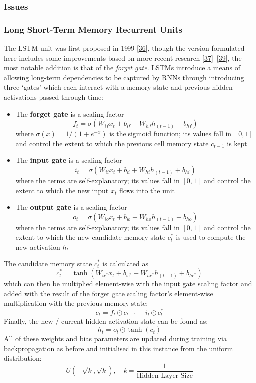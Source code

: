 \documentclass[12pt,]{article}
\providecommand{\tightlist}{%
  \setlength{\itemsep}{0pt}\setlength{\parskip}{0pt}}
\begin{document}
\hypertarget{issues}{%
\subsubsection{Issues}\label{issues}}

\hypertarget{long-short-term-memory-recurrent-units}{%
\subsubsection{Long Short-Term Memory Recurrent
Units}\label{long-short-term-memory-recurrent-units}}

The LSTM unit was first proposed in 1999
{[}\protect\hyperlink{ref-gers1999learning}{36}{]}, though the version
formulated here includes some improvements based on more recent research
{[}\protect\hyperlink{ref-sak2014long}{37}{]}--{[}\protect\hyperlink{ref-zebin2018human}{39}{]},
the most notable addition is that of the \emph{forget gate}. LSTMs
introduce a means of allowing long-term dependencies to be captured by
RNNs through introducing three `gates' which each interact with a memory
state and previous hidden activations passed through time:

\begin{itemize}
\tightlist
\item
  The \textbf{forget gate} is a scaling factor
  \[f_t = \sigma(W_{if} x_t + b_{if} + W_{hf} h_{(t-1)} + b_{hf})\]
  where \(\sigma(x) = 1 / (1 + e^{-x})\) is the sigmoid function; its
  values fall in \([0,1]\) and control the extent to which the previous
  cell memory state \(c_{t-1}\) is kept
\item
  The \textbf{input gate} is a scaling factor
  \[i_t = \sigma(W_{ii} x_t + b_{ii} + W_{hi} h_{(t-1)} + b_{hi})\]
  where the terms are self-explanatory; its values fall in \([0,1]\) and
  control the extent to which the new input \(x_t\) flows into the unit
\item
  The \textbf{output gate} is a scaling factor
  \[o_t = \sigma(W_{io} x_t + b_{io} + W_{ho} h_{(t-1)} + b_{ho})\]
  where the terms are self-explanatory; its values fall in \([0,1]\) and
  control the extent to which the new candidate memory state \(c^*_t\)
  is used to compute the new activation \(h_t\)
\end{itemize}

The candidate memory state \(c^*_t\) is calculated as
\[c^*_t = \tanh(W_{ic^*} x_t + b_{ic^*} + W_{hc^*} h_{(t-1)} + b_{hc^*})\]
which can then be multiplied element-wise with the input gate scaling
factor and added with the result of the forget gate scaling factor's
element-wise multiplication with the previous memory state:
\[c_t = f_t \odot c_{t-1} + i_t \odot c^*_t\] Finally, the new / current
hidden activation state can be found as: \[h_t = o_t \odot \tanh(c_t)\]
All of these weights and bias parameters are updated during training via
backpropagation as before and initialised in this instance from the
uniform distribution:
\[U(-\sqrt{k}, \sqrt{k}),\quad k = \frac{1}{\text{Hidden Layer Size}}\]
\end{document}

